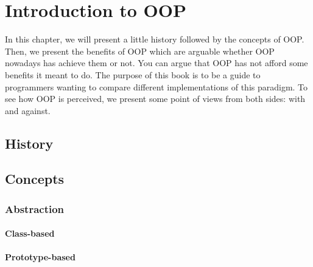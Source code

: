 \documentclass[12pt]{book}
\begin{document}
		\chapter{Introduction to OOP}
\fi

\begin{introduction}
	In this chapter, we will present a little history followed by the concepts of OOP.
	Then, we present the benefits of OOP which are arguable whether OOP nowadays has achieve them or not. 
	You can argue that OOP has not afford some benefits it meant to do. 
	The purpose of this book is to be a guide to programmers wanting to compare different implementations of this paradigm. 
	To see how OOP is perceived, we present some point of views from both sides: with and against.
\end{introduction}

\section{History}


\section{Concepts}

\subsection{Abstraction}


\subsubsection{Class-based}

\subsubsection{Prototype-based}

\end{document}
